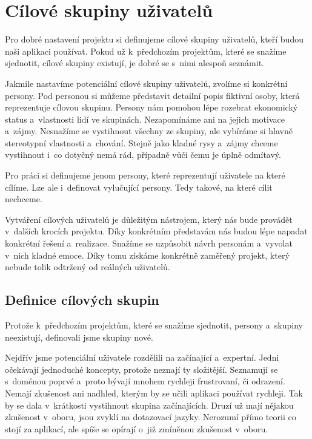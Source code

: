 \chapter{Cílové skupiny uživatelů}

Pro dobré nastavení projektu si definujeme cílové skupiny uživatelů, kteří budou naši aplikaci používat. Pokud už k~předchozím projektům, které se snažíme sjednotit, cílové skupiny existují, je dobré se s~nimi alespoň seznámit.

Jakmile nastavíme potenciální cílové skupiny uživatelů, zvolíme si konkrétní persony. Pod personou si můžeme představit detailní popis fiktivní osoby, která reprezentuje cílovou skupinu. Persony nám pomohou lépe rozebrat ekonomický status a~vlastnosti lidí ve skupinách. Nezapomínáme ani na jejich motivace a~zájmy. Nesnažíme se vystihnout všechny ze skupiny, ale vybíráme si hlavně stereotypní vlastnosti a~chování. Stejně jako kladné rysy a~zájmy chceme vystihnout i~co dotyčný nemá rád, případně vůči čemu je úplně odmítavý. 

Pro práci si definujeme jenom persony, které reprezentují uživatele na které cílíme. Lze ale i~definovat vylučující persony. Tedy takové, na které cílit nechceme.

Vytváření cílových uživatelů je důležitým nástrojem, který nás bude provádět v~dalších krocích projektu. Díky konkrétním představám nás budou lépe napadat konkrétní řešení a~realizace. Snažíme se uzpůsobit návrh personám a~vyvolat v~nich kladné emoce. Díky tomu získáme konkrétně zaměřený projekt, který nebude tolik odtržený od reálných uživatelů.

\section{Definice cílových skupin}

Protože k~předchozím projektům, které se snažíme sjednotit, persony a~skupiny neexistují, definovali jsme skupiny nové.

Nejdřív jsme potenciální uživatele rozdělili na začínající a~expertní. Jedni očekávají jednoduché koncepty, protože neznají ty složitější. Seznamují se s~doménou poprvé a~proto bývají mnohem rychleji frustrovaní, či odrazení. Nemají zkušenost ani nadhled, kterým by se učili aplikaci používat rychleji. Tak by se dala v~krátkosti vystihnout skupina začínajících. Druzí už mají nějakou zkušenost v~oboru, jsou zvyklí na dotazovací jazyky. Nerozumí přímo teorii co stojí za aplikací, ale spíše se opírají o~již zmíněnou zkušenost v~oboru.

